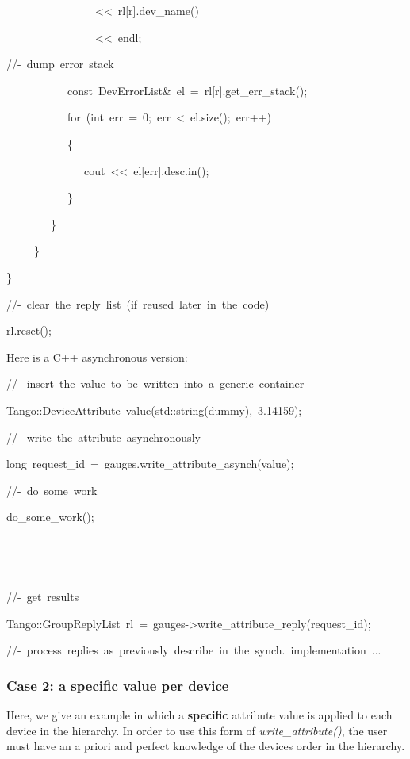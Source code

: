 \begin{lyxcode}
~~~~~~~~~~~~~~~~<\textcompwordmark{}<~rl{[}r{]}.dev\_name()

~~~~~~~~~~~~~~~~<\textcompwordmark{}<~endl;

//-~dump~error~stack

~~~~~~~~~~~const~DevErrorList\&~el~=~rl{[}r{]}.get\_err\_stack();

~~~~~~~~~~~for~(int~err~=~0;~err~<~el.size();~err++)

~~~~~~~~~~~\{

~~~~~~~~~~~~~~cout~<\textcompwordmark{}<~el{[}err{]}.desc.in();

~~~~~~~~~~~\}

~~~~~~~~\}

~~~~~\}

\}

//-~clear~the~reply~list~(if~reused~later~in~the~code)

rl.reset();
\end{lyxcode}


Here is a C++ asynchronous version:


\begin{lyxcode}
//-~insert~the~value~to~be~written~into~a~generic~container

Tango::DeviceAttribute~value(std::string(\textquotedbl{}dummy\textquotedbl{}),~3.14159);

//-~write~the~attribute~asynchronously

long~request\_id~=~gauges.write\_attribute\_asynch(value);

//-~do~some~work

do\_some\_work();

~

~

//-~get~results

Tango::GroupReplyList~rl~=~gauges->write\_attribute\_reply(request\_id);

//-~process~replies~as~previously~describe~in~the~synch.~implementation~...
\end{lyxcode}


\subsubsection{Case 2: a specific value per device\label{subsec:Case-2-writing}}

Here, we give an example in which a \textbf{specific} attribute value
is applied to each device in the hierarchy. In order to use this form
of \emph{write\_attribute()}, the user must have an \textquotedbl{}a
priori\textquotedbl{} and \textquotedbl{}perfect\textquotedbl{} knowledge
of the devices order in the hierarchy. 


